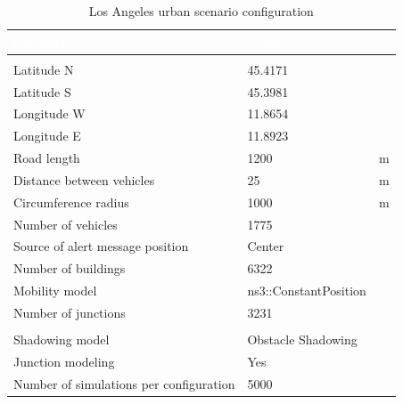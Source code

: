 		\begin{table}[H]
			\def\arraystretch{1.1}
			\begin{tabularx}{\textwidth}{l | l  l}
				\rowcolor{I} {\large \textcolor{white}{Parameter}} & {\large \textcolor{white}{Value}} & {\large \textcolor{white}{}} \TBstrut  \\
				\toprule
				\endhead
				\rowcolor{P} \multicolumn{3}{c}{Scenario configuration} \\
				\midrule[1pt]
				Latitude N								& 45.4171				& \textdegree		\\
				Latitude S								& 45.3981				& \textdegree		\\
				Longitude W								& 11.8654				& \textdegree		\\
				Longitude E								& 11.8923				& \textdegree		\\
				Road length 							& 1200	 				& m		\\
				Distance between vehicles 				& 25					& m		\\
				Circumference radius					& 1000					& m		\\
				Number of vehicles						& 1775					& 		\\
				Source of alert message position		& Center				&		\\
				Number of buildings						& 6322					&		\\
				Mobility model							& ns3::ConstantPosition	&		\\
				Number of junctions						& 3231					&		\\	
				\midrule[1pt]
				\rowcolor{P} \multicolumn{3}{c}{Network configuration} \\
				\midrule[1pt]
				Shadowing model							& Obstacle Shadowing 	&		\\
				Junction modeling						& Yes					&		\\
				\midrule[1pt]
				Number of simulations per configuration	& 5000					&		\\
				\bottomrule
			\end{tabularx}
			\caption{Los Angeles urban scenario configuration}
			\label{tab:padua-25}
		\end{table}
	
